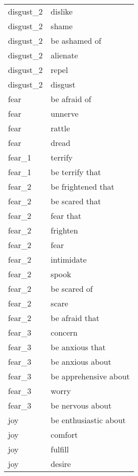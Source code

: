 \begin{longtable}{l|l}
disgust\_2      & dislike               \\
disgust\_2      & shame                 \\
disgust\_2      & be ashamed of         \\
disgust\_2      & alienate              \\
disgust\_2      & repel                 \\
disgust\_2      & disgust               \\
fear            & be afraid of          \\
fear            & unnerve               \\
fear            & rattle                \\
fear            & dread                 \\
fear\_1         & terrify               \\
fear\_1         & be terrify that       \\
fear\_2         & be frightened that    \\
fear\_2         & be scared that        \\
fear\_2         & fear that             \\
fear\_2         & frighten              \\
fear\_2         & fear                  \\
fear\_2         & intimidate            \\
fear\_2         & spook                 \\
fear\_2         & be scared of          \\
fear\_2         & scare                 \\
fear\_2         & be afraid that        \\
fear\_3         & concern               \\
fear\_3         & be anxious that       \\
fear\_3         & be anxious about      \\
fear\_3         & be apprehensive about \\
fear\_3         & worry                 \\
fear\_3         & be nervous about      \\
joy             & be enthusiastic about \\
joy             & comfort               \\
joy             & fulfill               \\
joy             & desire                \\

\end{longtable}
